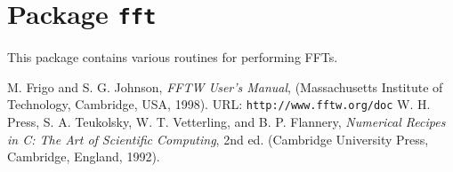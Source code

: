 \chapter{Package \texttt{fft}}

This package contains various routines for performing FFTs.

\newpage
\newpage
\newpage

\newpage\begin{thebibliography}{0}
  M. Frigo and S. G. Johnson,
  \textit{FFTW User's Manual},
  (Massachusetts Institute of Technology, Cambridge, USA, 1998).
  URL: \texttt{http://www.fftw.org/doc}
  W. H. Press, S. A. Teukolsky, W. T. Vetterling, and B. P. Flannery,
  \textit{Numerical Recipes in C: The Art of Scientific Computing}, 2nd ed.
  (Cambridge University Press, Cambridge, England, 1992).
\end{thebibliography}
